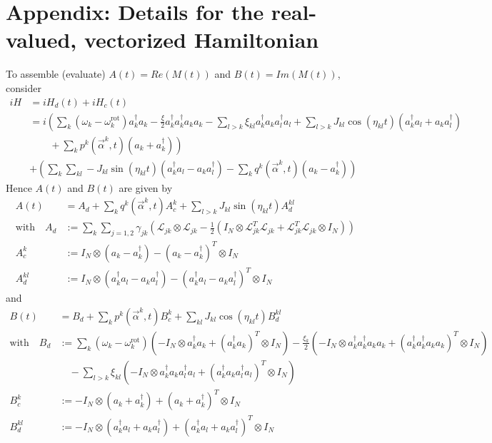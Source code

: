 \documentclass[11pt]{article}
\newcommand{\Ell}{\mathcal{L}}
\begin{document}
 \section{Appendix: Details for the real-valued, vectorized Hamiltonian}
   To assemble (evaluate) 
   $A(t) = Re(M(t))$ and $B(t) = Im(M(t))$, consider
   \begin{align}
    iH &= iH_d(t) + iH_c(t) \\
      &= i\left( \sum_k (\omega_k - \omega_k^{\text{rot}}) a_k^\dagger a_k - \frac{\xi}{2}a_k^\dagger a_k^\dagger a_k a_k  - \sum_{l>k}  \xi_{kl} a_k^\dagger a_k a_l^\dagger a_l +  \sum_{l>k} J_{kl} \cos(\eta_{kl}t)\left(a_k^\dagger a_l + a_ka_l^\dagger \right)
       \right.\\
      & \left. \quad \quad + \sum_k p^k(\vec{\alpha}^k,t) \left(a_k + a_k^\dagger\right) \right)\\
      &+ \left( \sum_k \sum_{kl} - J_{kl} \sin(\eta_{kl}t) \left(a_k^\dagger a_l - a_ka_l^\dagger\right)  - \sum_k q^k(\vec{\alpha}^k, t)\left(a_k - a_k^\dagger\right)\right)
   \end{align}
   Hence $A(t)$ and $B(t)$ are given by 
   \begin{align}
    A(t) &= A_d + \sum_k  q^k(\vec{\alpha}^k,t) A_c^k + \sum_{l>k} J_{kl} \sin(\eta_{kl}t)  A_d^{kl} \\
   \text{with} \quad  A_d &:= \sum_k \sum_{j=1,2} \gamma_{jk} \left( \Ell_{jk}\otimes\Ell_{jk} - \frac 1 2 \left(I_N \otimes \Ell_{jk}^T\Ell_{jk} + \Ell_{jk}^T\Ell_{jk}\otimes I_N\right) \right)\\
    A_c^k &:=  I_N \otimes \left(a_k - a_k^\dagger\right) - \left(a_k - a_k^\dagger\right)^T\otimes I_N \\
    A_d^{kl} &:=  I_N\otimes \left(a_k^\dagger a_l - a_k a_l^\dagger\right) - \left(a_k^\dagger a_l - a_k a_l^\dagger\right)^T\otimes I_N 
   \end{align}
   and
   \begin{align}
     B(t) &=  B_d + \sum_k p^k(\vec{\alpha}^k,t) B_c^k + \sum_{kl} J_{kl} \cos(\eta_{kl}t)B_d^{kl}\\
     \text{with} \quad B_d &:= \sum_k (\omega_k - \omega_k^{\text{rot}}) \left(-I_N \otimes a_k^\dagger a_k + (a_k^\dagger a_k)^T \otimes I_N \right) - \frac{\xi_k}{2}\left(- I_N \otimes a_k^\dagger a_k^\dagger a_k a_k + (a_k^\dagger a_k^\dagger a_k a_k )^T\otimes I_N\right)  \\
       &\quad - \sum_{l>k}  \xi_{kl} \left(-I_N \otimes a_k^\dagger a_k a_l^\dagger a_l + (a_k^\dagger a_k a_l^\dagger a_l)^T \otimes I_N \right)\\
       B_c^k &:=  - I_N \otimes \left(a_k + a_k^\dagger\right) + \left(a_k + a_k^\dagger\right)^T\otimes I_N \\
       B_d^{kl} &:=  - I_N\otimes \left(a_k^\dagger a_l + a_k a_l^\dagger\right) + \left(a_k^\dagger a_l + a_k a_l^\dagger\right)^T\otimes I_N \\
   \end{align}
\end{document}
